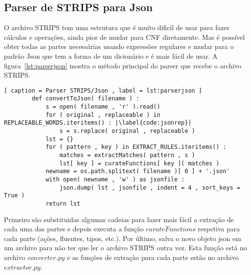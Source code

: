\subsection{Parser de STRIPS para Json}
\label{subsec:stripsjson}
	O archivo STRIPS tem uma estrutura que é muito dificil de usar para fazer cálculos e operações, ainda pior de mudar para CNF diretamente. Mas é possível obter todas as partes necessárias usando expressões regulares e mudar para o padrão Json que tem a forma de um dicionário e é mais fácil de usar. A figura~\ref{lst:parserjson} mostra o método principal do parser que recebe o archivo STRIPS.
	\renewcommand \lstlistingname{Código}
	\begin{lstlisting}[ caption = Parser STRIPS/Json , label = lst:parserjson ]
		def convertToJson( filename ) :
			s = open( filename , 'r' ).read()
			for ( original , replaceable ) in REPLACEABLE_WORDS.iteritems() : |\label{code:jsonrep}|
				s = s.replace( original , replaceable )
			lst = {}
			for ( pattern , key ) in EXTRACT_RULES.iteritems() :
				matches = extractMatches( pattern , s )
				lst[ key ] = curateFunctions[ key ]( matches )
			newname = os.path.splitext( filename )[ 0 ] + '.json'
			with open( newname , 'w' ) as jsonfile :
				json.dump( lst , jsonfile , indent = 4 , sort_keys = True )
			return lst
	\end{lstlisting}
	Primeiro são substituidas algumas cadeias para fazer mais fácil a extração de cada uma das partes e depois executa a função $curateFunctions$ respetiva para cada parte (ações, fluentes, tipos, etc.). Por último, salva o novo objeto json em um archivo para não ter que ler o archivo STRIPS outra vez. Esta função está no archivo ${converter.py}$ e as funções de extração para cada parte estão no archivo ${extractor.py}$.

